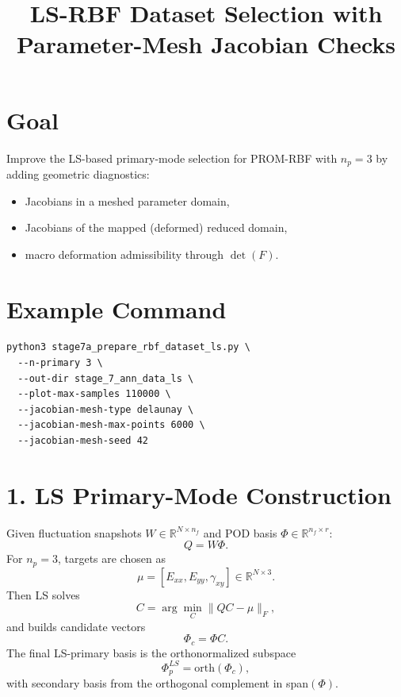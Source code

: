 \documentclass[11pt]{article}
\title{LS-RBF Dataset Selection with Parameter-Mesh Jacobian Checks}
\author{}
\date{}
\begin{document}
\maketitle

\section*{Goal}
Improve the LS-based primary-mode selection for PROM-RBF with $n_p=3$ by adding geometric diagnostics:
\begin{itemize}
\item Jacobians in a meshed parameter domain,
\item Jacobians of the mapped (deformed) reduced domain,
\item macro deformation admissibility through $\det(F)$.
\end{itemize}

\section*{Example Command}
\begin{verbatim}
python3 stage7a_prepare_rbf_dataset_ls.py \
  --n-primary 3 \
  --out-dir stage_7_ann_data_ls \
  --plot-max-samples 110000 \
  --jacobian-mesh-type delaunay \
  --jacobian-mesh-max-points 6000 \
  --jacobian-mesh-seed 42
\end{verbatim}

\section*{1. LS Primary-Mode Construction}
Given fluctuation snapshots $W\in\mathbb{R}^{N\times n_f}$ and POD basis $\Phi\in\mathbb{R}^{n_f\times r}$:
\begin{equation}
Q = W\Phi.
\end{equation}
For $n_p=3$, targets are chosen as
\begin{equation}
\mu = [E_{xx},E_{yy},\gamma_{xy}]\in\mathbb{R}^{N\times 3}.
\end{equation}
Then LS solves
\begin{equation}
C = \arg\min_C \|QC-\mu\|_F,
\end{equation}
and builds candidate vectors
\begin{equation}
\Phi_c = \Phi C.
\end{equation}
The final LS-primary basis is the orthonormalized subspace
\begin{equation}
\Phi_p^{LS} = \mathrm{orth}(\Phi_c),
\end{equation}
with secondary basis from the orthogonal complement in span$(\Phi)$.
\end{document}

